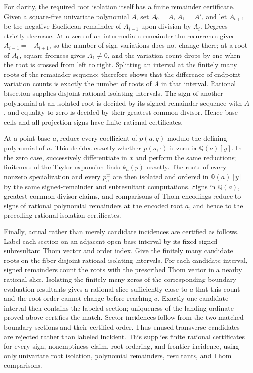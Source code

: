 For clarity, the required root isolation itself has a finite remainder certificate.  Given a square-free univariate polynomial \(A\), set \(A_0=A\), \(A_1=A'\), and let \(A_{i+1}\) be the negative Euclidean remainder of \(A_{i-1}\) upon division by \(A_i\).  Degrees strictly decrease.  At a zero of an intermediate remainder the recurrence gives \(A_{i-1}=-A_{i+1}\), so the number of sign variations does not change there; at a root of \(A_0\), square-freeness gives \(A_1\neq0\), and the variation count drops by one when the root is crossed from left to right.  Splitting an interval at the finitely many roots of the remainder sequence therefore shows that the difference of endpoint variation counts is exactly the number of roots of \(A\) in that interval.  Rational bisection supplies disjoint rational isolating intervals.  The sign of another polynomial at an isolated root is decided by its signed remainder sequence with \(A\), and equality to zero is decided by their greatest common divisor.  Hence base cells and all projection signs have finite rational certificates.

At a point base \(a\), reduce every coefficient of \(p(a,y)\) modulo the defining polynomial of \(a\).  This decides exactly whether \(p(a,\cdot)\) is zero in \(\mathbb Q(a)[y]\).  In the zero case, successively differentiate in \(x\) and perform the same reductions; finiteness of the Taylor expansion finds \(k_a(p)\) exactly.  The roots of every nonzero specialization and every \(p_a^{\mathrm{tr}}\) are then isolated and ordered in \(\mathbb Q(a)[y]\) by the same signed-remainder and subresultant computations.  Signs in \(\mathbb Q(a)\), greatest-common-divisor claims, and comparisons of Thom encodings reduce to signs of rational polynomial remainders at the encoded root \(a\), and hence to the preceding rational isolation certificates.

Finally, actual rather than merely candidate incidences are certified as follows.  Label each section on an adjacent open base interval by its fixed signed-subresultant Thom vector and order index.  Give the finitely many candidate roots on the fiber disjoint rational isolating intervals.  For each candidate interval, signed remainders count the roots with the prescribed Thom vector in a nearby rational slice.  Isolating the finitely many zeros of the corresponding boundary-evaluation resultants gives a rational slice sufficiently close to \(a\) that this count and the root order cannot change before reaching \(a\).  Exactly one candidate interval then contains the labeled section; uniqueness of the landing ordinate proved above certifies the match.  Sector incidences follow from the two matched boundary sections and their certified order.  Thus unused transverse candidates are rejected rather than labeled incident.  This supplies finite rational certificates for every sign, nonemptiness claim, root ordering, and frontier incidence, using only univariate root isolation, polynomial remainders, resultants, and Thom comparisons.

